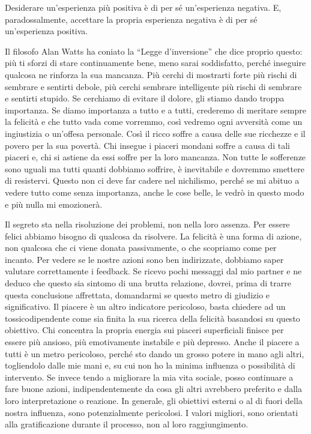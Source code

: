 \documentclass[12pt]{book} %
\begin{document}
Desiderare un'esperienza più positiva è di per sé un'esperienza negativa. 
E, paradossalmente, accettare la propria esperienza negativa è di per sé un'esperienza positiva.

Il filosofo Alan Watts ha coniato la “Legge d'inversione” che dice proprio questo: 
più ti sforzi di stare continuamente bene, meno sarai soddisfatto, perché inseguire qualcosa ne rinforza la sua mancanza. Più cerchi di mostrarti forte più rischi di sembrare e sentirti debole, più cerchi sembrare intelligente più rischi di sembrare e sentirti stupido. Se cerchiamo di evitare il dolore, gli stiamo dando troppa importanza. Se diamo importanza a tutto e a tutti, crederemo di
meritare sempre la felicità e che tutto vada come vorremmo, così vedremo ogni avversità come un ingiustizia o
un'offesa personale. Così il ricco soffre a causa delle sue ricchezze e il povero per la sua
povertà. Chi insegue i piaceri mondani soffre a causa di tali piaceri e, chi si astiene da essi soffre per la loro
mancanza. Non tutte le sofferenze sono uguali ma tutti quanti dobbiamo soffrire, è inevitabile e dovremmo smettere di
resistervi.
Questo non ci deve far cadere nel nichilismo, perché se mi abituo a vedere tutto come senza importanza, anche le cose belle, le vedrò in questo modo e più nulla mi emozionerà.

Il segreto sta nella risoluzione dei problemi, non nella loro assenza. Per essere felici abbiamo bisogno di qualcosa da
risolvere. La felicità è una forma di azione, non qualcosa che ci viene donata passivamente, o che scopriamo come per
incanto. Per vedere se le nostre azioni sono ben indirizzate, dobbiamo saper valutare correttamente i feedback. Se
ricevo pochi messaggi dal mio partner e ne deduco che questo sia sintomo di una brutta relazione, dovrei, prima di
trarre questa conclusione affrettata, domandarmi se questo metro di giudizio e significativo. Il piacere è un altro
indicatore pericoloso, basta chiedere ad un tossicodipendente come sia finita la sua ricerca della felicità basandosi
su questo obiettivo. Chi concentra la propria energia sui piaceri superficiali finisce per
essere più ansioso, più emotivamente instabile e più depresso. Anche il piacere a tutti è un metro pericoloso, perché
sto dando un grosso potere in mano agli altri, togliendolo dalle mie mani e, su cui non ho la minima influenza o
possibilità di intervento. Se invece tendo a migliorare la mia vita sociale, posso continuare a fare buone azioni,
indipendentemente da cosa gli altri avrebbero preferito e dalla loro interpretazione o reazione. In generale, gli
obiettivi esterni o al di fuori della nostra influenza, sono potenzialmente pericolosi. I valori migliori, sono
orientati alla gratificazione durante il processo, non al loro raggiungimento.
\end{document}
